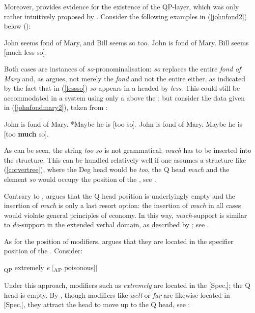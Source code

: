 Moreover, \citet[126--128]{corver1997} provides evidence for the existence of the QP-layer, which was only rather intuitively proposed by \citet{bresnan1973}. Consider the following examples in (\ref{johnfond2}) below (\citealt[126, exx. 20a and 21a]{corver1997}):

\ea \label{johnfond2}
\ea John seems fond of Mary, and Bill seems so too.
\ex	John is fond of Mary. Bill seems [much less so]. \label{lessso}
\z
\z

Both cases are instances of \textit{so}-pronominalisation: \textit{so} replaces the entire  \textit{fond of Mary} and, as \citet[126]{corver1997} argues, not merely the  \textit{fond} and not the entire  either, as indicated by the fact that in (\ref{lessso}) \textit{so} appears in a  headed by \textit{less}. This could still be accommodated in a system using only a  above the ; but consider the data given in (\ref{johnfondmary2}), taken from \citet[127, exx. 23a and 24a]{corver1997}:

\ea \label{johnfondmary2}
\ea John is fond of Mary. *Maybe he is [too so].
\ex	John is fond of Mary. Maybe he is [too \textbf{much} so].
\z
\z

As can be seen, the string \textit{too so} is not grammatical: \textit{much} has to be inserted into the structure. This can be handled relatively well if one assumes a structure like (\ref{corvertree}), where the Deg head would be \textit{too}, the Q head \textit{much} and the element \textit{so} would occupy the position of the , see \citet[127--128]{corver1997}.

Contrary to \citet{bresnan1973}, \citet[128--129]{corver1997} argues that the Q head position is underlyingly empty and the insertion of \textit{much} is only a last resort option: the insertion of \textit{much} in all cases would violate general principles of economy. In this way, \textit{much}-support is similar to \textit{do}-support in the extended verbal domain, as described by \citet{chomsky1991}; see \citet[129]{corver1997}.

As for the position of modifiers, \citet[154--161]{corver1997} argues that they are located in the specifier position of the . Consider:

\ea {[}\textsubscript{QP} extremely \emph{e} [\textsubscript{AP} poisonous]] \label{extremelyap}
\z

Under this approach, modifiers such as \textit{extremely} are located in the [Spec,]; the Q head is empty. By , though modifiers like \textit{well} or \textit{far} are likewise located in [Spec,], they attract the  head to move up to the Q head, see \citet[160]{corver1997}:

